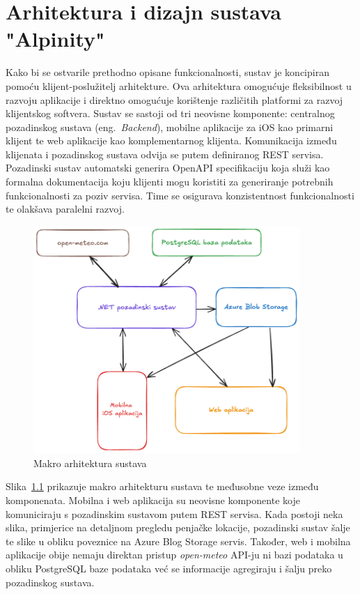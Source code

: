 \chapter{Arhitektura i dizajn sustava "Alpinity"}

Kako bi se ostvarile prethodno opisane funkcionalnosti, sustav je koncipiran pomoću klijent-poslužitelj arhitekture. Ova arhitektura omogućuje fleksibilnost u razvoju aplikacije i direktno omogućuje korištenje različitih platformi za razvoj klijentskog softvera. Sustav se sastoji od tri neovisne komponente: centralnog pozadinskog sustava (eng. \textit{Backend}), mobilne aplikacije za iOS kao primarni klijent te web aplikacije kao komplementarnog klijenta. 
Komunikacija između klijenata i pozadinskog sustava odvija se putem definiranog REST servisa. Pozadinski sustav automatski generira OpenAPI specifikaciju koja služi kao formalna dokumentacija koju klijenti mogu koristiti za generiranje potrebnih funkcionalnosti za poziv servisa. Time se osigurava konzistentnost funkcionalnosti te olakšava paralelni razvoj.

\begin{figure}[H]
    \centering
    \includegraphics[width=0.9\textwidth]{images/arhitektura/general_arch.png}
    \caption{Makro arhitektura sustava}
    \label{fig:arhitektura}
\end{figure}

Slika~\ref{fig:arhitektura} prikazuje makro arhitekturu sustava te međusobne veze između komponenata. Mobilna i web aplikacija su neovisne komponente koje komuniciraju s pozadinskim sustavom putem REST servisa. Kada postoji neka slika, primjerice na detaljnom pregledu penjačke lokacije, pozadinski sustav šalje te slike u obliku poveznice na Azure Blog Storage servis. Također, web i mobilna aplikacije obije nemaju direktan pristup \textit{open-meteo} API-ju ni bazi podataka u obliku PostgreSQL baze podataka već se informacije agregiraju i šalju preko pozadinskog sustava.

